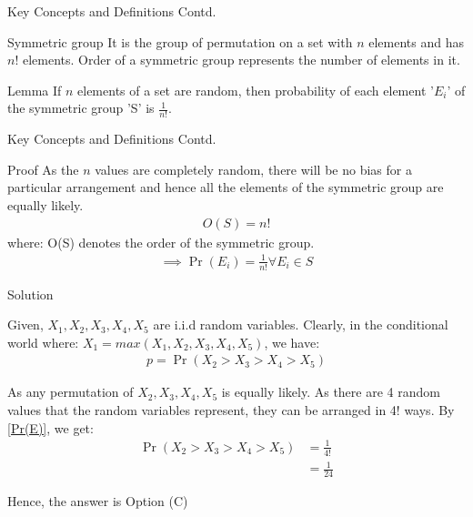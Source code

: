\documentclass{beamer}
\providecommand{\pr}[1]{\ensuremath{\Pr\left(#1\right)}}
\begin{document}
\begin{frame}{Key Concepts and Definitions Contd.}
\begin{block}{Symmetric group}
It is the group of permutation on a set with $n$ elements and has $n!$ elements. Order of a symmetric group represents the number of elements in it.
\end{block} 
\begin{block}{Lemma}
If $n$ elements of a set are random, then probability of each element '$E_i$' of the symmetric group 'S' is $\frac{1}{n!}$.
\end{block}

\end{frame}

\begin{frame}{Key Concepts and Definitions Contd.}
\begin{block}{Proof}
As the $n$ values are completely random, there will be no bias for a particular arrangement and hence all the elements of the symmetric group are equally likely.
\begin{align}
    O(S) = n!
\end{align}
where: O(S) denotes the order of the symmetric group.
\begin{align}
\implies \pr{E_i} = \frac{1}{n!} \forall E_i \in S \label{Pr(E)}
\end{align}
\end{block}
\end{frame}
\begin{frame}{Solution}
\begin{block}{}
Given, $X_1,X_2,X_3,X_4,X_5$ are i.i.d random variables.
Clearly, in the conditional world where: $X_1 = max(X_1,X_2,X_3,X_4,X_5)$, we have:
\begin{align}
 p = \pr{X_2 > X_3 > X_4 > X_5}
\end{align}
\end{block}
\begin{block}{}
As any permutation of $X_2,X_3,X_4,X_5$ is equally likely.
As there are 4 random values that the random variables represent, they can be arranged in 4! ways. By \eqref{Pr(E)}, we get:
\begin{align}
   \pr{X_2>X_3>X_4>X_5} &= \frac{1}{4!}\\&= \frac{1}{24}
\end{align}
\end{block}
\begin{block}{}
 Hence, the answer is Option (C)
\end{block}
\end{frame}
\end{document}
